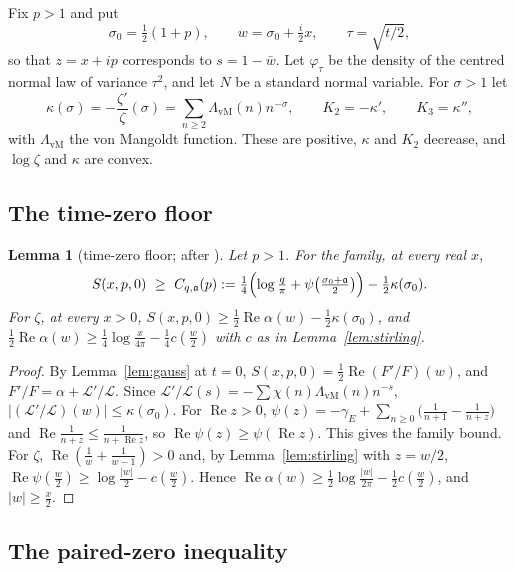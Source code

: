 \documentclass[11pt]{article}
\newtheorem{lemma}[theorem]{Lemma}
\theoremstyle{definition}
\theoremstyle{remark}
\newcommand{\cL}{\mathcal L}
\newcommand{\fa}{\mathfrak a}
\newcommand{\re}{\operatorname{Re}}
\numberwithin{equation}{section}
\begin{document}
Fix $p>1$ and put
\[
\sigma_0=\tfrac12(1+p),\qquad w=\sigma_0+\tfrac i2x,\qquad\tau=\sqrt{t/2},
\]
so that $z=x+ip$ corresponds to $s=1-\bar w$. Let $\varphi_\tau$ be the
density of the centred normal law of variance $\tau^2$, and let $N$ be a
standard normal variable. For $\sigma>1$ let
\[
\kappa(\sigma)=-\frac{\zeta'}{\zeta}(\sigma)=\sum_{n\ge2}\Lambda_{\mathrm{vM}}(n)n^{-\sigma},\qquad
K_2=-\kappa',\qquad K_3=\kappa'',
\]
with $\Lambda_{\mathrm{vM}}$ the von Mangoldt function. These are positive,
$\kappa$ and $K_2$ decrease, and $\log\zeta$ and $\kappa$ are convex.

\subsection{The time-zero floor}

\begin{lemma}[time-zero floor; after {\cite[Lemma~3.4]{p01}}]\label{lem:floor0}
Let $p>1$. For the family, at every real $x$,
\begin{equation}\label{eq:Cq}
S(x,p,0)\ \ge\ C_{q,\fa}(p):=\tfrac14\Bigl(\log\tfrac q\pi+\psi\bigl(\tfrac{\sigma_0+\fa}2\bigr)\Bigr)-\tfrac12\kappa(\sigma_0).
\end{equation}
For $\zeta$, at every $x>0$,
$S(x,p,0)\ge\frac12\re\alpha(w)-\frac12\kappa(\sigma_0)$, and
$\frac12\re\alpha(w)\ge\frac14\log\frac x{4\pi}-\frac14c(\frac w2)$ with
$c$ as in Lemma~\ref{lem:stirling}.
\end{lemma}

\begin{proof}
By Lemma~\ref{lem:gauss} at $t=0$, $S(x,p,0)=\frac12\re(F'/F)(w)$, and
$F'/F=\alpha+\cL'/\cL$. Since
$\cL'/\cL(s)=-\sum\chi(n)\Lambda_{\mathrm{vM}}(n)n^{-s}$,
$\lvert(\cL'/\cL)(w)\rvert\le\kappa(\sigma_0)$. For $\re z>0$,
$\psi(z)=-\gamma_E+\sum_{n\ge0}\bigl(\frac1{n+1}-\frac1{n+z}\bigr)$ and
$\re\frac1{n+z}\le\frac1{n+\re z}$, so $\re\psi(z)\ge\psi(\re z)$. This
gives the family bound. For $\zeta$, $\re(\frac1w+\frac1{w-1})>0$ and, by
Lemma~\ref{lem:stirling} with $z=w/2$,
$\re\psi(\frac w2)\ge\log\frac{\lvert w\rvert}2-c(\frac w2)$. Hence
$\re\alpha(w)\ge\frac12\log\frac{\lvert w\rvert}{2\pi}-\frac12c(\frac w2)$,
and $\lvert w\rvert\ge\frac x2$.
\end{proof}

\subsection{The paired-zero inequality}
\end{document}
